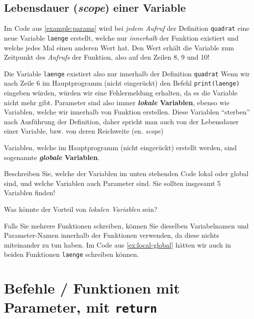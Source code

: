 \subsection{Lebensdauer (\textit{scope}) einer Variable}

Im Code aus \cref{example:params} wird bei \textit{jedem Aufruf} der Definition \lstinline|quadrat| eine neue Variable \texttt{laenge} erstellt, welche nur \textit{innerhalb} der Funktion existiert und welche jedes Mal einen anderen Wert hat. Den Wert erhält die Variable zum Zeitpunkt des \textit{Aufrufs} der Funktion, also auf den Zeilen 8, 9 und 10!

Die Variable \texttt{laenge} existiert also nur innerhalb der Definition \lstinline|quadrat| Wenn wir nach Zeile 6 im Hauptprogramm (nicht eingerückt) den Befehl \texttt{print(laenge)} eingeben würden, würden wir eine Fehlermeldung erhalten, da es die Variable nicht mehr gibt. Parameter sind also immer \textbf{\textit{lokale} Variablen}, ebenso wie Variablen, welche wir innerhalb von Funktion erstellen. Diese Variablen \enquote{sterben} nach Ausführung der Definition, daher spricht man auch von der Lebensdauer einer Variable, bzw. von deren Reichweite (en. \textit{scope})

Variablen, welche im Hauptprogramm (nicht eingerückt) erstellt werden, sind sogenannte \textbf{\textit{globale} Variablen}.

\begin{myexercise}\label{ex:local-global}
Beschreiben Sie, welche der Variablen im unten stehenden Code lokal oder global sind, und welche Variablen auch Parameter sind. Sie sollten insgesamt 5 Variablen finden!

\end{myexercise}

\begin{myexercise}
Was könnte der Vorteil von \textit{lokalen Variablen} sein?
\begin{myanswer}
Falls Sie mehrere Funktionen schreiben, können Sie dieselben Variabelnamen und Parameter-Namen innerhalb der Funktionen verwenden, da diese nichts miteinander zu tun haben. Im Code aus \cref{ex:local-global} hätten wir auch in beiden Funktionen \texttt{laenge} schreiben können.
\end{myanswer}
\end{myexercise}


\section{Befehle / Funktionen mit Parameter, mit \texorpdfstring{\lstinline|return|}{return}}
